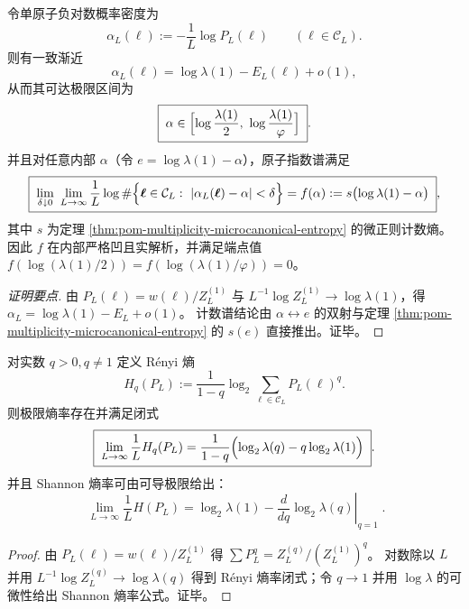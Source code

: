 \begin{proposition}\label{prop:pom-multiplicity-atom-multifractal}
令单原子负对数概率密度为
\[
\alpha_L(\boldsymbol{\ell}):=-\frac{1}{L}\log P_L(\boldsymbol{\ell})\qquad(\boldsymbol{\ell}\in\mathcal{C}_L).
\]
则有一致渐近
\[
\alpha_L(\boldsymbol{\ell})=\log\lambda(1)-E_L(\boldsymbol{\ell})+o(1),
\]
从而其可达极限区间为
\[
\boxed{\;
\alpha\in\Bigl[\log\frac{\lambda(1)}{2},\ \log\frac{\lambda(1)}{\varphi}\Bigr]\; } .
\]
并且对任意内部 \(\alpha\)（令 \(e=\log\lambda(1)-\alpha\)），原子指数谱满足
\[
\boxed{\;
\lim_{\delta\downarrow 0}\ \lim_{L\to\infty}\frac{1}{L}\log
\#\Bigl\{\boldsymbol{\ell}\in\mathcal{C}_L:\ |\alpha_L(\boldsymbol{\ell})-\alpha|<\delta\Bigr\}
=f(\alpha):=s\bigl(\log\lambda(1)-\alpha\bigr)\; } ,
\]
其中 \(s\) 为定理 \ref{thm:pom-multiplicity-microcanonical-entropy} 的微正则计数熵。
因此 \(f\) 在内部严格凹且实解析，并满足端点值 \(f(\log(\lambda(1)/2))=f(\log(\lambda(1)/\varphi))=0\)。
\end{proposition}
\begin{proof}[证明要点]
由 \(P_L(\boldsymbol{\ell})=w(\boldsymbol{\ell})/Z_L^{(1)}\) 与 \(L^{-1}\log Z_L^{(1)}\to\log\lambda(1)\)，得 \(\alpha_L=\log\lambda(1)-E_L+o(1)\)。
计数谱结论由 \(\alpha\leftrightarrow e\) 的双射与定理 \ref{thm:pom-multiplicity-microcanonical-entropy} 的 \(s(e)\) 直接推出。证毕。
\end{proof}

\begin{proposition}\label{prop:pom-multiplicity-renyi-continuous}
对实数 \(q>0,q\ne 1\) 定义 Rényi 熵
\[
H_q(P_L):=\frac{1}{1-q}\log_2\sum_{\boldsymbol{\ell}\in\mathcal{C}_L}P_L(\boldsymbol{\ell})^{q}.
\]
则极限熵率存在并满足闭式
\[
\boxed{\;
\lim_{L\to\infty}\frac{1}{L}H_q(P_L)
=\frac{1}{1-q}\Bigl(\log_2\lambda(q)-q\log_2\lambda(1)\Bigr)\; } .
\]
并且 Shannon 熵率可由可导极限给出：
\[
\boxed{\;
\lim_{L\to\infty}\frac{1}{L}H(P_L)
=\log_2\lambda(1)-\left.\frac{d}{dq}\log_2\lambda(q)\right|_{q=1}\; } .
\]
\end{proposition}
\begin{proof}
由 \(P_L(\boldsymbol{\ell})=w(\boldsymbol{\ell})/Z_L^{(1)}\) 得
\(
\sum P_L^q=Z_L^{(q)}/(Z_L^{(1)})^q
\)。
对数除以 \(L\) 并用 \(L^{-1}\log Z_L^{(q)}\to\log\lambda(q)\) 得到 Rényi 熵率闭式；令 \(q\to 1\) 并用 \(\log\lambda\) 的可微性给出 Shannon 熵率公式。证毕。
\end{proof}

